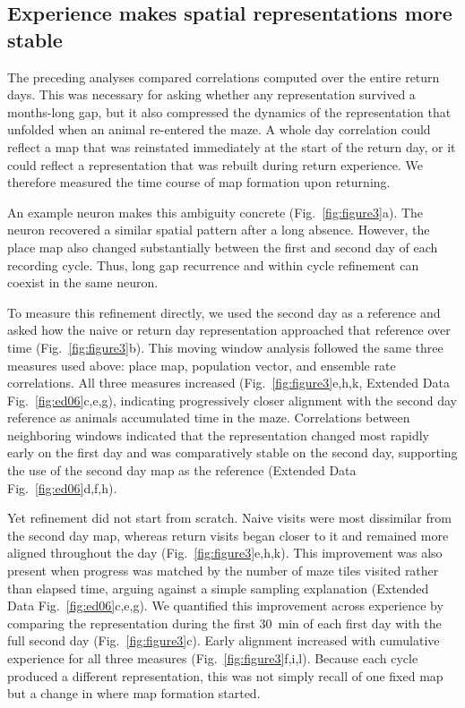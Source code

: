 \documentclass[fleqn,10pt]{wlscirep}
\begin{document}
\subsection*{Experience makes spatial representations more stable}
The preceding analyses compared correlations computed over the entire return days. This was necessary for asking whether any representation survived a months-long gap, but it also compressed the dynamics of the representation that unfolded when an animal re-entered the maze. A whole day correlation could reflect a map that was reinstated immediately at the start of the return day, or it could reflect a representation that was rebuilt during return experience. We therefore measured the time course of map formation upon returning.

An example neuron makes this ambiguity concrete (Fig.~\ref{fig:figure3}a). The neuron recovered a similar spatial pattern after a long absence. However, the place map also changed substantially between the first and second day of each recording cycle. Thus, long gap recurrence and within cycle refinement can coexist in the same neuron.

To measure this refinement directly, we used the second day as a reference and asked how the naive or return day representation approached that reference over time (Fig.~\ref{fig:figure3}b). This moving window analysis followed the same three measures used above: place map, population vector, and ensemble rate correlations. All three measures increased (Fig.~\ref{fig:figure3}e,h,k, Extended Data Fig.~\ref{fig:ed06}c,e,g), indicating progressively closer alignment with the second day reference as animals accumulated time in the maze. Correlations between neighboring windows indicated that the representation changed most rapidly early on the first day and was comparatively stable on the second day, supporting the use of the second day map as the reference (Extended Data Fig.~\ref{fig:ed06}d,f,h).

Yet refinement did not start from scratch. Naive visits were most dissimilar from the second day map, whereas return visits began closer to it and remained more aligned throughout the day (Fig.~\ref{fig:figure3}e,h,k). This improvement was also present when progress was matched by the number of maze tiles visited rather than elapsed time, arguing against a simple sampling explanation (Extended Data Fig.~\ref{fig:ed06}c,e,g). We quantified this improvement across experience by comparing the representation during the first 30~min of each first day with the full second day (Fig.~\ref{fig:figure3}c). Early alignment increased with cumulative experience for all three measures (Fig.~\ref{fig:figure3}f,i,l). Because each cycle produced a different representation, this was not simply recall of one fixed map but a change in where map formation started. 
\end{document}
